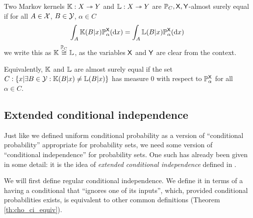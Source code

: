 
\begin{definition}
Two Markov kernels $\mathbb{K}:X\rightarrowtriangle Y$ and $\mathbb{L}:X\rightarrowtriangle Y$ are $\mathbb{P}_C,\mathsf{X},\mathsf{Y}$-almost surely equal if for all $A\in\mathcal{X}$, $B\in \mathcal{Y}$, $\alpha\in C$
\begin{align}
    \int_A \mathbb{K}(B|x)\mathbb{P}_\alpha^{\mathsf{X}}(\mathrm{d}x) = \int_A\mathbb{L}(B|x)\mathbb{P}_\alpha^{\mathsf{X}}(\mathrm{d}x)
\end{align}
we write this as $\mathbb{K}\overset{\mathbb{P}_C}{\cong}\mathbb{L}$, as the variables $\mathsf{X}$ and $\mathsf{Y}$ are clear from the context.
\end{definition}

Equivalently, $\mathbb{K}$ and $\mathbb{L}$ are almost surely equal if the set $C:\{x|\exists B\in\mathcal{Y}:\mathbb{K}(B|x)\neq\mathbb{L}(B|x)\}$ has measure 0 with respect to $\mathbb{P}_\alpha^{\mathsf{X}}$ for all $\alpha\in C$.

\subsection{Extended conditional independence}

Just like we defined uniform conditional probability as a version of ``conditional probability'' appropriate for probability sets, we need some version of ``conditional independence'' for probability sets. One such has already been given in some detail: it is the idea of \emph{extended conditional independence} defined in \citet{constantinou_extended_2017}.

We will first define regular conditional independence. We define it in terms of a having a conditional that ``ignores one of its inputs'', which, provided conditional probabilities exists, is equivalent to other common definitions (Theorem \ref{th:cho_ci_equiv}).

